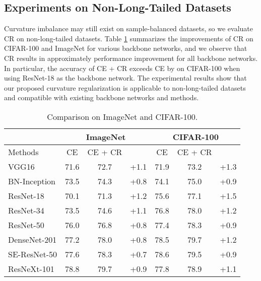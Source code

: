 \documentclass[10pt,twocolumn,letterpaper]{article}
\begin{document}
\subsection{Experiments on Non-Long-Tailed Datasets}
\label{sec6.4}



Curvature imbalance may still exist on sample-balanced datasets, so we evaluate CR on non-long-tailed datasets. Table \ref{table3} summarizes the improvements of CR on CIFAR-100 and ImageNet for various backbone networks, and we observe that CR results in approximately  performance improvement for all backbone networks. In particular, the accuracy of CE + CR exceeds CE by  on CIFAR-100 when using ResNet-18 \cite{paper21} as the backbone network. The experimental results show that our proposed curvature regularization is applicable to non-long-tailed datasets and compatible with existing backbone networks and methods.

\begin{table}[t]
\small
\renewcommand\arraystretch{1.08}
\setlength{\tabcolsep}{2.6pt} \caption{Comparison on ImageNet and CIFAR-100.}
\vskip -0.06in
\label{table3}
\centering  
\begin{small}
\begin{tabular}{l|ccc|ccc}
\hline  \toprule
   & \multicolumn{3}{c|}{ImageNet}  &  \multicolumn{3}{c}{CIFAR-100}  \\ \hline
Methods & CE  & CE + CR &  & CE & CE + CR &  \\ \hline
VGG16 \cite{paper16}&  71.6 & 72.7 & \textcolor[RGB]{0,201,87}{+1.1} & 71.9 & 73.2 & \textcolor[RGB]{0,201,87}{+1.3} \\
BN-Inception \cite{paper17} &  73.5 & 74.3 & \textcolor[RGB]{0,201,87}{+0.8} & 74.1 & 75.0 & \textcolor[RGB]{0,201,87}{+0.9} \\
ResNet-18 \cite{paper21} &  70.1 & 71.3 & \textcolor[RGB]{0,201,87}{+1.2}  &75.6   & 77.1 & \textcolor[RGB]{0,201,87}{+1.5}  \\
ResNet-34 \cite{paper21} &  73.5 & 74.6 & \textcolor[RGB]{0,201,87}{+1.1}  & 76.8 & 78.0 & \textcolor[RGB]{0,201,87}{+1.2}  \\
ResNet-50 \cite{paper21} &  76.0 & 76.8 & \textcolor[RGB]{0,201,87}{+0.8} & 77.4 & 78.3 & \textcolor[RGB]{0,201,87}{+0.9}  \\
DenseNet-201 \cite{paper18} &  77.2 & 78.0 & \textcolor[RGB]{0,201,87}{+0.8}  & 78.5 & 79.7 & \textcolor[RGB]{0,201,87}{+1.2}  \\
SE-ResNet-50 \cite{paper19} &  77.6 & 78.3 & \textcolor[RGB]{0,201,87}{+0.7}  & 78.6 & 79.5 & \textcolor[RGB]{0,201,87}{+0.9}  \\
ResNeXt-101 \cite{paper20} &  78.8 & 79.7 & \textcolor[RGB]{0,201,87}{+0.9}  & 77.8  & 78.9 & \textcolor[RGB]{0,201,87}{+1.1}  \\
 \bottomrule \hline
 \end{tabular}
\end{small}
\vskip -0.14in
\end{table}
\end{document}
